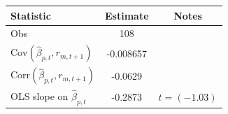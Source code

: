 \begin{tabular}{lcc}
\toprule
Statistic & Estimate & Notes \\
\midrule
Obs & 108 & \\
$\text{Cov}(\hat{\beta}_{p,t}, r_{m,t+1})$ & -0.008657 & \\
$\text{Corr}(\hat{\beta}_{p,t}, r_{m,t+1})$ & -0.0629 & \\
OLS slope on $\hat{\beta}_{p,t}$ & -0.2873 & $t = (-1.03)$ \\
\bottomrule
\end{tabular}